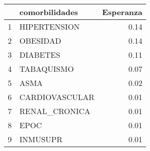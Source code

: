 \begin{table}[ht]
\centering
\begin{tabular}{rlr}
  \hline
 & comorbilidades & Esperanza \\ 
  \hline
1 & HIPERTENSION & 0.14 \\ 
  2 & OBESIDAD & 0.14 \\ 
  3 & DIABETES & 0.11 \\ 
  4 & TABAQUISMO & 0.07 \\ 
  5 & ASMA & 0.02 \\ 
  6 & CARDIOVASCULAR & 0.01 \\ 
  7 & RENAL\_CRONICA & 0.01 \\ 
  8 & EPOC & 0.01 \\ 
  9 & INMUSUPR & 0.01 \\ 
   \hline
\end{tabular}
\end{table}
